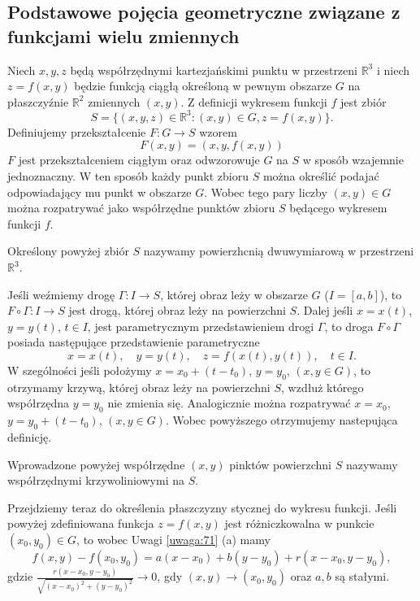 \documentclass[leqno]{article}
\begin{document}
\begin{justify}
\subsection{Podstawowe pojęcia geometryczne związane z funkcjami wielu zmiennych}

Niech $x,y,z$ będą współrzędnymi kartezjańskimi punktu w przestrzeni $\mathbb{R}^3$ i niech $z = f(x,y)$ będzie funkcją 
ciągłą określoną w pewnym obszarze $G$ na płaszczyźnie $\mathbb{R}^2$ zmiennych $(x,y)$. Z definicji wykresem funkcji $f$ jest zbiór
\[
    S = \{(x,y,z) \in \mathbb{R}^3 : (x,y) \in G, z = f(x,y)\}.
\]
Definiujemy przekształcenie $F : G \to S$ wzorem 
\[
    F(x,y) = (x,y, f(x,y))
\]
$F$ jest przekształceniem ciągłym oraz odwzorowuje $G$ na $S$ w sposób wzajemnie jednoznaczny. W ten sposób każdy punkt zbioru $S$ można określić podajać odpowiadający mu 
punkt w obszarze $G$. Wobec tego pary liczby $(x,y) \in G$ można rozpatrywać jako współrzędne punktów zbioru $S$ będącego wykresem funkcji $f$.

\begin{defn}
    Określony powyżej zbiór $S$ nazywamy powierzhcnią dwuwymiarową w przestrzeni $\mathbb{R}^3$.
\end{defn}

Jeśli weźmiemy drogę $\Gamma : I \to S$, której obraz leży w obszarze $G$ ($ I = [a,b]$), to $F \circ \Gamma : I \to S$ jest drogą, której obraz leży na powierzchni $S$.
Dalej jeśli $x = x(t)$, $y = y(t)$, $t \in I$, jest parametrycznym przedstawieniem drogi $\Gamma$, to droga $F \circ \Gamma$ posiada następujące przedstawienie parametryczne
\[
    x = x(t), \quad y = y(t), \quad z = f(x(t), y(t)), \quad t \in I.
\]
W szególności jeśli położymy $x = x_0 + (t - t_0)$, $y = y_0$, $(x,y \in G)$, to otrzymamy krzywą, której obraz leży na powierzchni $S$, wzdłuż którego współrzędna 
$y = y_0$ nie zmienia się. Analogicznie można rozpatrywać $x = x_0$, $y = y_0 + (t - t_0)$, $(x,y \in G)$. Wobec powyższego otrzymujemy nastepująca definicję.

\begin{defn}
    Wprowadzone powyżej współrzędne $(x,y)$ pinktów powierzchni $S$ nazywamy współrzędnymi krzywoliniowymi na $S$.
\end{defn}

\setcounter{equation}{132}

Przejdziemy teraz do określenia płaszczyzny stycznej do wykresu funkcji. Jeśli powyżej zdefiniowana funkcja $z = f(x,y)$ jest różniczkowalna w 
punkcie $(x_0, y_0) \in G$, to wobec Uwagi \ref{uwaga:71} (a) mamy
\begin{equation}\label{eq:133}
    f(x,y) - f(x_0, y_0) = a(x - x_0) + b(y - y_0) + r(x - x_0, y - y_0),
\end{equation}
gdzie $\frac{r(x - x_0, y - y_0)}{\sqrt{{(x - x_0)}^2 + {(y - y_0)}^2}} \to 0$, gdy $(x,y) \to (x_0, y_0)$ oraz $a,b$ są stałymi.


\end{justify}
\end{document}
